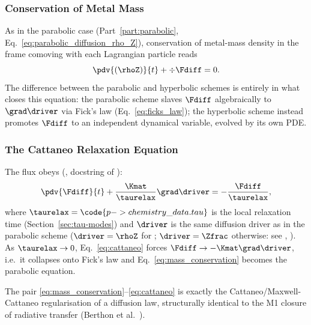 \subsubsection{Conservation of Metal Mass}
As in the parabolic case (Part~\ref{part:parabolic},
Eq.~\eqref{eq:parabolic_diffusion_rho_Z}), conservation of metal-mass
density in the frame comoving with each Lagrangian particle reads
\begin{equation}
  \label{eq:mass_conservation}
  \pdv{(\rhoZ)}{t} + \div \Fdiff = 0 .
\end{equation}
The difference between the parabolic and hyperbolic schemes is entirely in
what closes this equation: the parabolic scheme slaves $\Fdiff$
algebraically to $\grad\driver$ via Fick's law
(Eq.~\eqref{eq:ficks_law}); the hyperbolic scheme instead promotes
$\Fdiff$ to an independent dynamical variable, evolved by its own PDE.

\subsubsection{The Cattaneo Relaxation Equation}
The flux obeys (, docstring of
):
\begin{equation}
  \label{eq:cattaneo}
  \pdv{\Fdiff}{t} + \frac{\Kmat}{\taurelax}\grad\driver = -\frac{\Fdiff}{\taurelax} ,
\end{equation}
where $\taurelax = \code{p->chemistry\_data.tau}$ is the local relaxation
time (Section~\ref{sec:tau-modes}) and $\driver$ is the same diffusion
driver as in the parabolic scheme ($\driver=\rhoZ$ for
; $\driver=\Zfrac$ otherwise: see
, ).
As $\taurelax\to0$, Eq.~\eqref{eq:cattaneo} forces
$\Fdiff\to-\Kmat\grad\driver$, i.e.\ it collapses onto Fick's law and
Eq.~\eqref{eq:mass_conservation} becomes the parabolic equation.

The pair \eqref{eq:mass_conservation}--\eqref{eq:cattaneo} is exactly the
Cattaneo/Maxwell-Cattaneo regularisation of a diffusion law, structurally
identical to the M1 closure of radiative transfer
(Berthon et al.~\citeyear{Berthon2007}).


